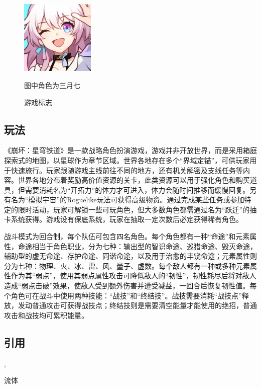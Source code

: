\begin{figure}
    \centering
    \includegraphics[width=100pt]{docs/imgs/HSR}


    \vspace{-8pt}
	\figurenotes 图中角色为三月七
    \vspace{-8pt}
    \caption{游戏标志}
    \label{fig:figure1}
\end{figure}

\subsection{玩法}

《崩坏：星穹铁道》是一款战略角色扮演游戏，游戏并非开放世界，而是采用箱庭探索式的地图，以星球作为章节区域。世界各地存在多个“界域定锚”，可供玩家用于快速旅行。玩家跟随游戏主线前往不同的地方，还有机关解密及支线任务等内容。世界各地分布着奖励高价值资源的关卡，此类资源可以用于强化角色和购买道具，但需要消耗名为“开拓力”的体力才可进入，体力会随时间推移而缓慢回复。另有名为“模拟宇宙”的Roguelike玩法可获得高级物资。通过完成某些任务或参加特定的限时活动，玩家可解锁一些可玩角色，但大多数角色都需通过名为“跃迁”的抽卡系统获得。游戏设有保底系统，玩家在抽取一定次数后必定获得稀有角色。

战斗模式为回合制，每个队伍可包含四名角色。每个角色都有一种“命途”和元素属性，命途相当于角色职业，分为七种：输出型的智识命途、巡猎命途、毁灭命途，辅助型的虚无命途、存护命途、同谐命途，以及用于治愈的丰饶命途；元素属性则分为七种：物理、火、冰、雷、风、量子、虚数。每个敌人都有一种或多种元素属性作为其“弱点”，使用其弱点属性攻击可降低敌人的“韧性”，韧性耗尽后将对敌人造成“弱点击破”效果，使敌人受到额外伤害并遭受减益，一回合后恢复韧性值。每个角色可在战斗中使用两种技能：“战技”和“终结技”。战技需要消耗“战技点”释放，发动普通攻击可获得战技点；终结技则是需要清空能量才能使用的绝招，普通攻击和战技均可累积能量。

\subsection{引用}
\citet{xu_wall_2015}, \citet{luthi_expanding_2009}

流体\cite{jeong_velocity-gradient_2003,luthi_expanding_2009}
